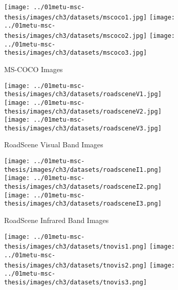 \begin{figure}[htbp]
    \centering
    \begin{subfigure}[b]{\textwidth}
        \texttt{[image: ../01metu-msc-thesis/images/ch3/datasets/mscoco1.jpg]}
        \texttt{[image: ../01metu-msc-thesis/images/ch3/datasets/mscoco2.jpg]}
        \texttt{[image: ../01metu-msc-thesis/images/ch3/datasets/mscoco3.jpg]}
        \caption{MS-COCO \cite{lin2014microsoft} Images}
        \label{fig:ch3:mscoco}
    \end{subfigure}
    \vspace{0.01cm}
    \begin{subfigure}[b]{\textwidth}
        \texttt{[image: ../01metu-msc-thesis/images/ch3/datasets/roadsceneV1.jpg]}
        \texttt{[image: ../01metu-msc-thesis/images/ch3/datasets/roadsceneV2.jpg]}
        \texttt{[image: ../01metu-msc-thesis/images/ch3/datasets/roadsceneV3.jpg]}
        \caption{RoadScene \cite{xu2020fusiondn} Visual Band Images}
        \label{fig:ch3:tno}
    \end{subfigure}
    \vspace{0.01cm}
    \begin{subfigure}[b]{\textwidth}
        \texttt{[image: ../01metu-msc-thesis/images/ch3/datasets/roadsceneI1.png]}
        \texttt{[image: ../01metu-msc-thesis/images/ch3/datasets/roadsceneI2.png]}
        \texttt{[image: ../01metu-msc-thesis/images/ch3/datasets/roadsceneI3.png]}
        \caption{RoadScene \cite{xu2020fusiondn} Infrared Band Images}
    \end{subfigure} 
    \vspace{0.01cm}
    \begin{subfigure}[b]{\textwidth}
        \texttt{[image: ../01metu-msc-thesis/images/ch3/datasets/tnovis1.png]}
        \texttt{[image: ../01metu-msc-thesis/images/ch3/datasets/tnovis2.png]}
        \texttt{[image: ../01metu-msc-thesis/images/ch3/datasets/tnovis3.png]}

\end{subfigure}
\end{figure}
